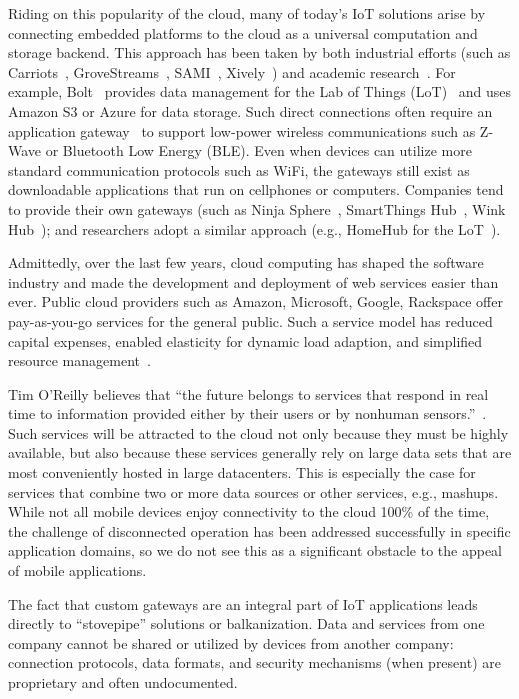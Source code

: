 Riding on this popularity of the cloud, many of today's IoT solutions arise by
connecting embedded platforms to the cloud as a universal computation and
storage backend. This approach has been taken by both industrial efforts (such
as Carriots~\cite{carriots}, GroveStreams~\cite{grovestreams}, SAMI~\cite{sami},
Xively~\cite{xively}) and academic research~\cite{gupta2014bolt,
  zachariah1001internet}. For example, Bolt~\cite{gupta2014bolt} provides data
management for the Lab of Things (LoT)~\cite{brush2013lab} and uses Amazon S3 or
Azure for data storage. Such direct connections often require an application
gateway~\cite{zachariah1001internet} to support low-power wireless
communications such as Z-Wave or Bluetooth Low Energy (BLE).  Even when devices
can utilize more standard communication protocols such as WiFi, the gateways
still exist as downloadable applications that run on cellphones or computers.
Companies tend to provide their own gateways (such as Ninja Sphere~\cite{ninja},
SmartThings Hub~\cite{smartthings}, Wink Hub~\cite{wink}); and researchers adopt
a similar approach (e.g., HomeHub for the LoT~\cite{brush2013lab}).

Admittedly, over the last few years, cloud computing has shaped the software
industry and made the development and deployment of web services easier than
ever. Public cloud providers such as Amazon, Microsoft, Google, Rackspace offer
pay-as-you-go services for the general public.  Such a service model has reduced
capital expenses, enabled elasticity for dynamic load adaption, and simplified
resource management~\cite{armbrust2010view}.

Tim O'Reilly believes that ``the future belongs to services that respond in real
time to information provided either by their users or by nonhuman
sensors.''~\cite{siegele2008let}. Such services will be attracted to the cloud
not only because they must be highly available, but also because these services
generally rely on large data sets that are most conveniently hosted in large
datacenters. This is especially the case for services that combine two or more
data sources or other services, e.g., mashups. While not all mobile devices
enjoy connectivity to the cloud 100\% of the time, the challenge of disconnected
operation has been addressed successfully in specific application domains, so we
do not see this as a significant obstacle to the appeal of mobile applications.

The fact that custom gateways are an integral part of IoT applications leads
directly to ``stovepipe'' solutions or balkanization. Data and services from one
company cannot be shared or utilized by devices from another company: connection
protocols, data formats, and security mechanisms (when present) are proprietary
and often undocumented.

